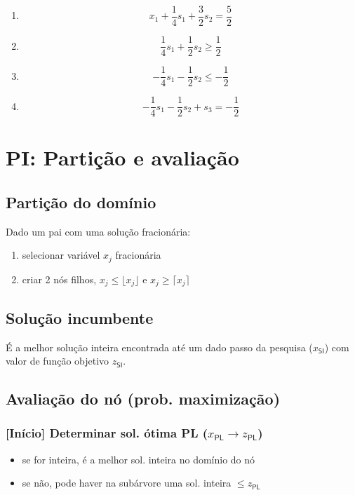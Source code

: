 \documentclass[10pt, a4paper]{article}
\begin{document}
\begin{multicols}{2}
\begin{enumerate}
    \item \[ x_1 + \frac{1}{4}s_1 + \frac{3}{2} s_2 = \frac{5}{2} \]
    \item \[ \frac{1}{4}s_1 + \frac{1}{2} s_2 \ge \frac{1}{2} \]
    \item \[ - \frac{1}{4}s_1 - \frac{1}{2} s_2 \le - \frac{1}{2} \]
    \item \[ - \frac{1}{4}s_1 - \frac{1}{2} s_2 + s_3 = - \frac{1}{2} \]
\end{enumerate}





\section{PI: Partição e avaliação}

\subsection{Partição do domínio}

Dado um pai com uma solução fracionária:
\begin{enumerate}
    \item selecionar variável \(x_j\) fracionária
    \item criar 2 nós filhos, \(x_j \le \lfloor x_j \rfloor\) e \(x_j \ge \lceil x_j \rceil \)
\end{enumerate}

\subsection{Solução incumbente}

É a melhor solução inteira encontrada até um dado passo da pesquisa (\(x_\textsf{SI}\)) com valor de função objetivo \(z_\textsf{SI}\).

\subsection{Avaliação do nó (prob. maximização)}

\subsubsection{[Início] Determinar sol. ótima PL (\(x_\textsf{PL} \rightarrow z_\textsf{PL}\))}

\begin{itemize}
    \item se for inteira, é a melhor sol. inteira no domínio do nó
    \item se não, pode haver na subárvore uma sol. inteira \(\le z_\textsf{PL}\)
\end{itemize}


\end{multicols}
\end{document}
